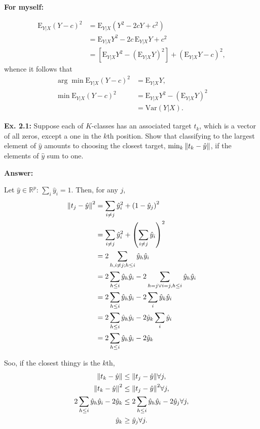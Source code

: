 \documentclass{article}
\begin{document}
\textbf{For myself:}

\begin{align}
	\mathrm E_{Y|X}\left(Y-c\right)^2&=\mathrm E_{Y|X}\left(Y^2-2cY+c^2\right)\\
	&=\mathrm E_{Y|X}Y^2-2c\,\mathrm E_{Y|X}Y+c^2\\
	&=\left[\mathrm E_{Y|X}Y^2-\left(\mathrm E_{Y|X}Y\right)^2\right]+\left(\mathrm E_{Y|X}Y-c\right)^2,
\end{align}
whence it follows that
\begin{align}
	\arg\min\mathrm E_{Y|X}\left(Y-c\right)^2&=\mathrm E_{Y|X}Y,\\
	\min\mathrm E_{Y|X}\left(Y-c\right)^2&=\mathrm E_{Y|X}Y^2-\left(\mathrm E_{Y|X}Y\right)^2\\
	&=\mathrm{Var}(Y|X).
\end{align}

\textbf{Ex. 2.1: }Suppose each of $K$-classes has an associated target $t_k$, which is a vector of all zeros, except a one in the $k$th position. Show that classifying to the largest element of $\hat{y}$ amounts to choosing the closest target, $\min_k\norm{t_k-\hat{y}}$, if the elements of $\hat{y}$ sum to one.

\textbf{Answer:}

Let $\hat{y}\in\mathbb R^p:\,\sum_i\hat{y}_i=1$. Then, for any $j$,
\begin{align}
	\norm{t_j-\hat{y}}^2&=\sum_{i\neq j}\hat{y}_i^2+\left(1-\hat{y}_j\right)^2\\
	&=\sum_{i\neq j}\hat{y}_i^2+\left(\sum_{i\neq j}\hat{y}_i\right)^2\\
	&=2\sum_{h,i\neq j;h\leq i}\hat{y}_h\hat{y}_i\\
	&=2\sum_{h\leq i}\hat{y}_h\hat{y}_i-2\sum_{h=j\vee i=j,h\leq i}\hat{y}_h\hat{y}_i\\
	&=2\sum_{h\leq i}\hat{y}_h\hat{y}_i-2\sum_i\hat{y}_k\hat{y}_i\\
	&=2\sum_{h\leq i}\hat{y}_h\hat{y}_i-2\hat{y}_k\sum_i\hat{y}_i\\
	&=2\sum_{h\leq i}\hat{y}_h\hat{y}_i-2\hat{y}_k\\
\end{align}

Soo, if the closest thingy is the $k$th,
\begin{align}
	\norm{t_k-\hat{y}}&\leq\norm{t_j-\hat{y}}\forall j,\\
	\norm{t_k-\hat{y}}^2&\leq\norm{t_j-\hat{y}}^2\forall j,\\
	2\sum_{h\leq i}\hat{y}_h\hat{y}_i-2\hat{y}_k&\leq2\sum_{h\leq i}\hat{y}_h\hat{y}_i-2\hat{y}_j\forall j,\\
	\hat{y}_k&\geq\hat{y}_j\forall j.
\end{align}
\end{document}
